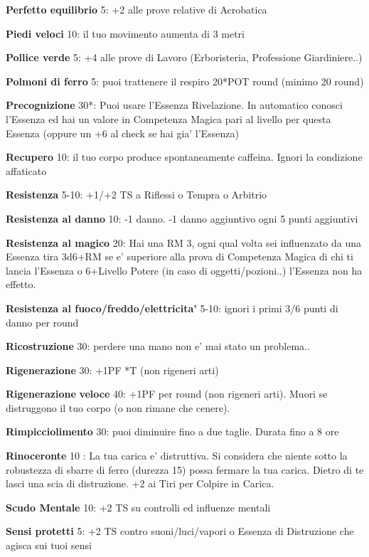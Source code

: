 \documentclass[a4paper,11pt,twoside,openany]{dndbook}
\begin{document}
\textbf{Perfetto equilibrio} 5: +2 alle prove relative di Acrobatica

\textbf{Piedi veloci} 10: il tuo movimento aumenta di 3 metri

\textbf{Pollice verde} 5: +4 alle prove di Lavoro (Erboristeria, Professione Giardiniere..)

\textbf{Polmoni di ferro} 5: puoi trattenere il respiro 20*POT round (minimo 20 round)

\textbf{Precognizione} 30{*}: Puoi usare l'Essenza Rivelazione. In automatico conosci l'Essenza ed hai un valore in Competenza Magica pari al livello per questa Essenza (oppure un +6 al check se hai gia' l'Essenza)

\textbf{Recupero} 10: il tuo corpo produce spontaneamente caffeina.  Ignori la condizione affaticato

\textbf{Resistenza} 5-10: +1/+2 TS a Riflessi o Tempra o Arbitrio

\textbf{Resistenza al danno} 10: -1 danno. -1 danno aggiuntivo ogni 5 punti aggiuntivi

\textbf{Resistenza al magico} 20: Hai una RM 3, ogni qual volta sei influenzato da una Essenza tira 3d6+RM se e' superiore alla prova di Competenza Magica di chi ti lancia l'Essenza o 6+Livello Potere (in caso di oggetti/pozioni..) l'Essenza non ha effetto.

\textbf{Resistenza al fuoco/freddo/elettricita'} 5-10: ignori i primi 3/6 punti di danno per round

\textbf{Ricostruzione} 30: perdere una mano non e' mai stato un problema..

\textbf{Rigenerazione} 30: +1PF {*}T (non rigeneri arti)

\textbf{Rigenerazione} \textbf{veloce} 40: +1PF per round (non rigeneri arti). Muori se distruggono il tuo corpo (o non rimane che cenere).

\textbf{Rimpicciolimento} 30: puoi diminuire fino a due taglie. Durata fino a 8 ore

\textbf{Rinoceronte} 10 : La tua carica e' distruttiva. Si considera che niente sotto la robustezza di sbarre di ferro (durezza 15) possa fermare la tua carica. Dietro di te lasci una scia di distruzione. +2 ai Tiri per Colpire in Carica.

\textbf{Scudo Mentale} 10: +2 TS su controlli ed influenze mentali

\textbf{Sensi protetti} 5: +2 TS contro suoni/luci/vapori o Essenza di Distruzione che agisca sui tuoi sensi
\end{document}
